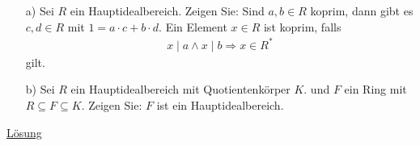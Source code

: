 \begin{exe}\label{aufgabe:10.4}
	\begin{enumerate}
		\item[a)]
		Sei $ R $ ein Hauptidealbereich.
		Zeigen Sie:
		Sind $ a,b \in R $ koprim,
		dann gibt es $ c,d \in R $ mit $ 1 = a\cdot c + b \cdot d $.
		Ein Element $ x \in R $ ist koprim, falls
		\begin{align*}
		x \mid a \wedge x \mid b 
		\Rightarrow 
		x \in R^\ast
		\end{align*}
		gilt.
		
		\item[b)]
		Sei $ R $ ein Hauptidealbereich mit Quotientenkörper $ K $.
		und $ F $ ein Ring mit $ R \subseteq F \subseteq K $.
		Zeigen Sie:
		$ F $ ist ein Hauptidealbereich. 
	\end{enumerate}
	\hyperlink{loes:10.4}{Lösung}
\end{exe}